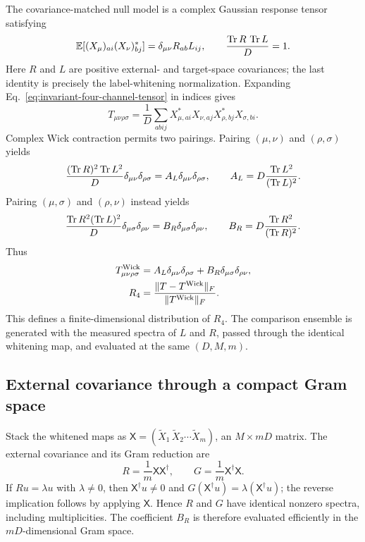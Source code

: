 The covariance-matched null model is a complex Gaussian response tensor satisfying
\begin{equation}
 \mathbb E[(X_\mu)_{ai}(X_\nu)^*_{bj}]
 =\delta_{\mu\nu}R_{ab}L_{ij},
 \qquad
 \frac{\operatorname{Tr} R\,\operatorname{Tr} L}{D}=1 .
 \label{eq:separable-gaussian-covariance}
\end{equation}
Here \(R\) and \(L\) are positive external- and target-space covariances; the last identity is precisely the label-whitening normalization. Expanding Eq.~\eqref{eq:invariant-four-channel-tensor} in indices gives
\begin{equation}
 T_{\mu\nu\rho\sigma}
 =\frac{1}{D}\sum_{abij}
 X_{\mu,ai}^*X_{\nu,aj}
 X_{\rho,bj}^*X_{\sigma,bi}.
 \label{eq:four-channel-indices}
\end{equation}
Complex Wick contraction permits two pairings. Pairing \((\mu,\nu)\) and \((\rho,\sigma)\) yields
\begin{equation}
 \frac{(\operatorname{Tr} R)^2\operatorname{Tr} L^2}{D}
 \delta_{\mu\nu}\delta_{\rho\sigma}
 =A_L\delta_{\mu\nu}\delta_{\rho\sigma},
 \qquad
 A_L=D\frac{\operatorname{Tr} L^2}{(\operatorname{Tr} L)^2}.
 \label{eq:left-wick-pairing}
\end{equation}
Pairing \((\mu,\sigma)\) and \((\rho,\nu)\) instead yields
\begin{equation}
 \frac{\operatorname{Tr} R^2(\operatorname{Tr} L)^2}{D}
 \delta_{\mu\sigma}\delta_{\rho\nu}
 =B_R\delta_{\mu\sigma}\delta_{\rho\nu},
 \qquad
 B_R=D\frac{\operatorname{Tr} R^2}{(\operatorname{Tr} R)^2}.
 \label{eq:right-wick-pairing}
\end{equation}
Thus
\begin{equation}
 \begin{aligned}
 T^{\rm Wick}_{\mu\nu\rho\sigma}
 &=A_L\delta_{\mu\nu}\delta_{\rho\sigma}
 +B_R\delta_{\mu\sigma}\delta_{\rho\nu},\\
 R_4&=\frac{\|T-T^{\rm Wick}\|_F}{\|T^{\rm Wick}\|_F}.
 \end{aligned}
 \label{eq:wick-residual-appendix}
\end{equation}
This defines a finite-dimensional distribution of \(R_4\). The comparison ensemble is generated with the measured spectra of \(L\) and \(R\), passed through the identical whitening map, and evaluated at the same \((D,M,m)\).

\subsection{External covariance through a compact Gram space}

Stack the whitened maps as \(\mathsf X=(\widetilde X_1\,\widetilde X_2\cdots\widetilde X_m)\), an \(M\times mD\) matrix. The external covariance and its Gram reduction are
\begin{equation}
 R=\frac{1}{m}\mathsf X\mathsf X^\dagger,\qquad
 G=\frac{1}{m}\mathsf X^\dagger\mathsf X.
 \label{eq:gram-reduction}
\end{equation}
If \(R u=\lambda u\) with \(\lambda\ne0\), then \(\mathsf X^\dagger u\ne0\) and \(G(\mathsf X^\dagger u)=\lambda(\mathsf X^\dagger u)\); the reverse implication follows by applying \(\mathsf X\). Hence \(R\) and \(G\) have identical nonzero spectra, including multiplicities. The coefficient \(B_R\) is therefore evaluated efficiently in the \(mD\)-dimensional Gram space.

